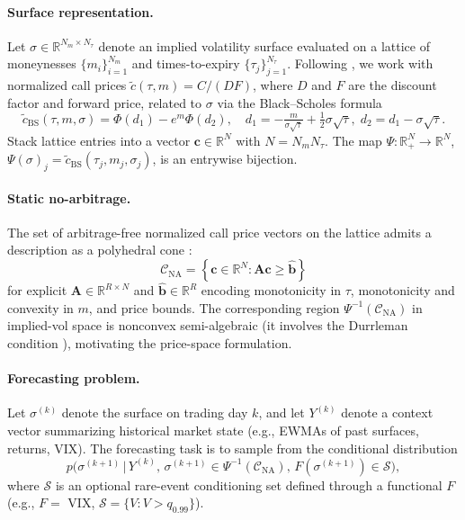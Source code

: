 \documentclass{article}
\newcommand{\R}{\mathbb{R}}
\newcommand{\1}{\mathbf{1}}
\newcommand{\cC}{\mathcal{C}}
\newcommand{\cS}{\mathcal{S}}
\begin{document}
\paragraph{Surface representation.} Let $\sigma \in \R^{N_m \times N_\tau}$ denote an implied volatility surface evaluated on a lattice of moneynesses $\{m_i\}_{i=1}^{N_m}$ and times-to-expiry $\{\tau_j\}_{j=1}^{N_\tau}$. Following \citet{cohen2021}, we work with normalized call prices $\tilde c(\tau, m) = C / (DF)$, where $D$ and $F$ are the discount factor and forward price, related to $\sigma$ via the Black--Scholes formula
\begin{equation}
\tilde c_{\mathrm{BS}}(\tau, m, \sigma) = \Phi(d_1) - e^m \Phi(d_2), \quad d_1 = -\tfrac{m}{\sigma\sqrt{\tau}} + \tfrac{1}{2}\sigma\sqrt{\tau}, \; d_2 = d_1 - \sigma\sqrt{\tau}.
\label{eq:bs}
\end{equation}
Stack lattice entries into a vector $\mathbf{c} \in \R^N$ with $N = N_m N_\tau$. The map $\Psi : \R^{N}_+ \to \R^N$, $\Psi(\sigma)_j = \tilde c_{\mathrm{BS}}(\tau_j, m_j, \sigma_j)$, is an entrywise bijection.

\paragraph{Static no-arbitrage.} The set of arbitrage-free normalized call price vectors on the lattice admits a description as a polyhedral cone \citep{cohen2020}:
\begin{equation}
\cC_{\mathrm{NA}} = \left\{ \mathbf{c} \in \R^N : \mathbf{A}\mathbf{c} \ge \hat{\mathbf{b}} \right\}
\label{eq:cna}
\end{equation}
for explicit $\mathbf{A} \in \R^{R \times N}$ and $\hat{\mathbf{b}} \in \R^R$ encoding monotonicity in $\tau$, monotonicity and convexity in $m$, and price bounds. The corresponding region $\Psi^{-1}(\cC_{\mathrm{NA}})$ in implied-vol space is nonconvex semi-algebraic (it involves the Durrleman condition \citep{gatheral2014}), motivating the price-space formulation.

\paragraph{Forecasting problem.} Let $\sigma^{(k)}$ denote the surface on trading day $k$, and let $Y^{(k)}$ denote a context vector summarizing historical market state (e.g., EWMAs of past surfaces, returns, VIX). The forecasting task is to sample from the conditional distribution
\begin{equation}
p\bigl(\sigma^{(k+1)} \,\big|\, Y^{(k)},\, \sigma^{(k+1)} \in \Psi^{-1}(\cC_{\mathrm{NA}}),\, F(\sigma^{(k+1)}) \in \cS\bigr),
\label{eq:goal}
\end{equation}
where $\cS$ is an optional rare-event conditioning set defined through a functional $F$ (e.g., $F = $ VIX, $\cS = \{V : V > q_{0.99}\}$).
\end{document}
